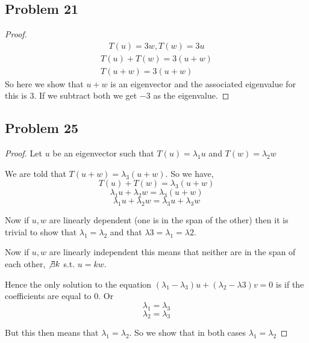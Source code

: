 \documentclass[a4paper]{report}
\begin{document}
 \subsection*{Problem 21}
 \begin{proof}
    
 \begin{align*}
   T(u) = 3w, T(w) = 3u     
 \end{align*}
 \begin{align*}
    T(u) + T(w) = 3(u + w)\\
    T(u + w) = 3 (u + w)
 \end{align*}
So here we show that $u + w$ is an eigenvector and the associated eigenvalue for this is $3$. If we subtract both we get $-3$ as the eigenvalue.



 \end{proof}
 \subsection*{Problem 25}
 \begin{proof}
    
 Let $u$ be an eigenvector such that $T(u) = \lambda_1 u$ and $T(w) = \lambda_2 w$

 We are told that $T(u + w) = \lambda_3(u + w)$. So we have, 
 $$ T(u) + T(w) = \lambda_3(u + w) $$ 
 $$ \lambda_1 u + \lambda_2 w = \lambda_3(u + w) $$ 
 $$ \lambda_1 u  + \lambda_2 w = \lambda_3 u + \lambda_3 w $$ 

 Now if $u,w$ are linearly dependent (one is in the span of the other) then it is trivial to show that $\lambda_1 = \lambda_2$ and that $\lambda 3 = \lambda_1 = \lambda 2$.

 Now if $u,w$ are linearly independent this means that neither are in the span of each other, $\not \exists k $ s.t. $u = kw$.

 Hence the only solution to the equation  $(\lambda_1 - \lambda_3) u + (\lambda_2 - \lambda 3)v = 0$ is if the coefficients are equal to 0. Or 
 $$ \lambda_1 = \lambda_3 $$ 
 $$ \lambda_2 = \lambda_3 $$ 

 But this then means that $\lambda_1= \lambda_2$. So we show that in both cases $\lambda_1 = \lambda_2$

 \end{proof}
\end{document}
